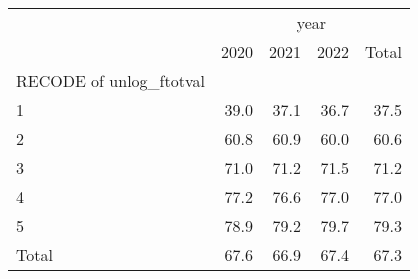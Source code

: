\begin{tabular}{lllll}
\cline{1-5}
\multicolumn{1}{c}{} &
  \multicolumn{4}{|c}{year} \\
\multicolumn{1}{c}{} &
  \multicolumn{1}{|r}{2020} &
  \multicolumn{1}{r}{2021} &
  \multicolumn{1}{r}{2022} &
  \multicolumn{1}{r}{Total} \\
\cline{1-5}
\multicolumn{1}{l}{RECODE of unlog\_ftotval} &
  \multicolumn{1}{|r}{} &
  \multicolumn{1}{r}{} &
  \multicolumn{1}{r}{} &
  \multicolumn{1}{r}{} \\
\multicolumn{1}{l}{\hspace{1em}1} &
  \multicolumn{1}{|r}{39.0} &
  \multicolumn{1}{r}{37.1} &
  \multicolumn{1}{r}{36.7} &
  \multicolumn{1}{r}{37.5} \\
\multicolumn{1}{l}{\hspace{1em}2} &
  \multicolumn{1}{|r}{60.8} &
  \multicolumn{1}{r}{60.9} &
  \multicolumn{1}{r}{60.0} &
  \multicolumn{1}{r}{60.6} \\
\multicolumn{1}{l}{\hspace{1em}3} &
  \multicolumn{1}{|r}{71.0} &
  \multicolumn{1}{r}{71.2} &
  \multicolumn{1}{r}{71.5} &
  \multicolumn{1}{r}{71.2} \\
\multicolumn{1}{l}{\hspace{1em}4} &
  \multicolumn{1}{|r}{77.2} &
  \multicolumn{1}{r}{76.6} &
  \multicolumn{1}{r}{77.0} &
  \multicolumn{1}{r}{77.0} \\
\multicolumn{1}{l}{\hspace{1em}5} &
  \multicolumn{1}{|r}{78.9} &
  \multicolumn{1}{r}{79.2} &
  \multicolumn{1}{r}{79.7} &
  \multicolumn{1}{r}{79.3} \\
\multicolumn{1}{l}{\hspace{1em}Total} &
  \multicolumn{1}{|r}{67.6} &
  \multicolumn{1}{r}{66.9} &
  \multicolumn{1}{r}{67.4} &
  \multicolumn{1}{r}{67.3} \\
\cline{1-5}
\end{tabular}
